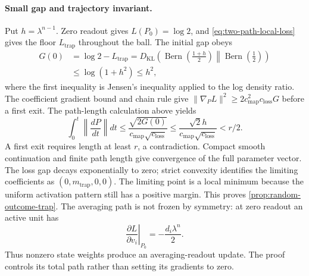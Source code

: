 \paragraph{Small gap and trajectory invariant.}
Put $h=\lambda^{n-1}$. Zero readout gives $L(P_0)=\log2$, and
\cref{eq:two-path-local-loss} gives the floor $L_{\mathrm{trap}}$ throughout the ball.
The initial gap obeys
\[
\begin{aligned}
 G(0)&=\log2-L_{\mathrm{trap}}
 =D_{\mathrm{KL}}\left(\operatorname{Bern}\left(\frac{1+h}{2}\right)
                 \middle\|\operatorname{Bern}\left(\frac12\right)\right)\\
 &\le\log(1+h^2)\le h^2,
\end{aligned}
\]
where the first inequality is Jensen's inequality applied to the log density ratio.
The coefficient gradient bound and chain rule give
$\|\nabla_P L\|^2\ge2c_{\mathrm{map}}^2c_{\mathrm{loss}}G$ before a first exit.
The path-length calculation above yields
\begin{equation}
 \int_0^t\left\|\frac{dP}{dt}\right\|dt
 \le\frac{\sqrt{2G(0)}}{c_{\mathrm{map}}\sqrt{c_{\mathrm{loss}}}}
 \le\frac{\sqrt2h}{c_{\mathrm{map}}\sqrt{c_{\mathrm{loss}}}}<r/2.
 \label{eq:random-trap-path}
\end{equation}
A first exit requires length at least $r$, a contradiction.
Compact smooth continuation and finite path length give convergence of the full
parameter vector. The loss gap decays exponentially to zero; strict convexity
identifies the limiting coefficients as $(0,m_{\mathrm{trap}},0,0)$.
The limiting point is a local minimum because the uniform activation pattern
still has a positive margin. This proves \cref{prop:random-outcome-trap}.
The averaging path is not frozen by symmetry: at zero readout an active unit has
\[
 \left.\frac{\partial L}{\partial v_i}\right|_{P_0}
 =-\frac{d_i\lambda^n}{2}.
\]
Thus nonzero state weights produce an averaging-readout update. The proof controls
its total path rather than setting its gradients to zero.

